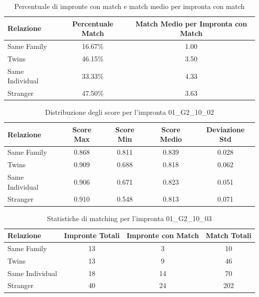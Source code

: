 \begin{table}[htbp]
\centering
\caption{Percentuale di impronte con match e match medio per impronta con match}
\label{tab:match_percentage_01_G2_10_02}
\begin{tabular}{|l|c|c|}
\hline
\textbf{Relazione} & \textbf{Percentuale Match} & \textbf{Match Medio per Impronta con Match} \\
\hline
Same Family & 16.67\% & 1.00 \\
\hline
Twins & 46.15\% & 3.50 \\
\hline
Same Individual & 33.33\% & 4.33 \\
\hline
Stranger & 47.50\% & 3.63 \\
\hline
\end{tabular}
\end{table}


\begin{table}[htbp]
\centering
\caption{Distribuzione degli score per l'impronta 01\_G2\_10\_02}
\label{tab:scores_01_G2_10_02}
\begin{tabular}{|l|c|c|c|c|}
\hline
\textbf{Relazione} & \textbf{Score Max} & \textbf{Score Min} & \textbf{Score Medio} & \textbf{Deviazione Std} \\
\hline
Same Family & 0.868 & 0.811 & 0.839 & 0.028 \\
\hline
Twins & 0.909 & 0.688 & 0.818 & 0.062 \\
\hline
Same Individual & 0.906 & 0.671 & 0.823 & 0.051 \\
\hline
Stranger & 0.910 & 0.548 & 0.813 & 0.071 \\
\hline
\end{tabular}
\end{table}


\begin{table}[htbp]
\centering
\caption{Statistiche di matching per l'impronta 01\_G2\_10\_03}
\label{tab:results_01_G2_10_03}
\begin{tabular}{|l|c|c|c|}
\hline
\textbf{Relazione} & \textbf{Impronte Totali} & \textbf{Impronte con Match} & \textbf{Match Totali} \\
\hline
Same Family & 13 & 3 & 10 \\
\hline
Twins & 13 & 9 & 46 \\
\hline
Same Individual & 18 & 14 & 70 \\
\hline
Stranger & 40 & 24 & 202 \\
\hline
\end{tabular}
\end{table}


